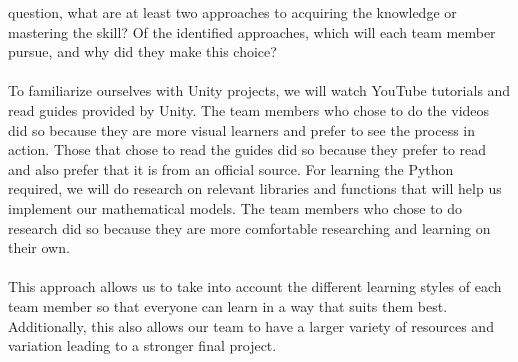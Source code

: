 \documentclass[12pt]{article}
\begin{document}
\begin{enumerate}
  question, what are at least two approaches to acquiring the knowledge or
  mastering the skill?  Of the identified approaches, which will each team
  member pursue, and why did they make this choice?
  \\\\
  To familiarize ourselves with Unity projects, we will watch YouTube tutorials and read guides provided by Unity.
  The team members who chose to do the videos did so because they are more visual learners and prefer to see the process in action.
  Those that chose to read the guides did so because they prefer to read and also prefer that it is from an official source.
  For learning the Python required, we will do research on relevant libraries and functions that will help us implement our mathematical models.
  The team members who chose to do research did so because they are more comfortable researching and learning on their own.
  \\\\
  This approach allows us to take into account the different learning styles of each team member so that everyone can learn in a way that suits them best. 
  Additionally, this also allows our team to have a larger variety of resources and variation leading to a stronger final project.

\end{enumerate}
\end{document}
